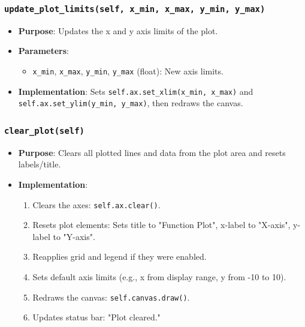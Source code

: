 \documentclass[12pt,a4paper]{report}
\begin{document}
\subsubsection{\texttt{update\_plot\_limits(self, x\_min, x\_max, y\_min, y\_max)}}
\begin{itemize}
    \item \textbf{Purpose}: Updates the x and y axis limits of the plot.
    \item \textbf{Parameters}:
        \begin{itemize}
            \item \texttt{x\_min}, \texttt{x\_max}, \texttt{y\_min}, \texttt{y\_max} (float): New axis limits.
        \end{itemize}
    \item \textbf{Implementation}: Sets \texttt{self.ax.set\_xlim(x\_min, x\_max)} and \texttt{self.ax.set\_ylim(y\_min, y\_max)}, then redraws the canvas.
\end{itemize}

\subsubsection{\texttt{clear\_plot(self)}}
\begin{itemize}
    \item \textbf{Purpose}: Clears all plotted lines and data from the plot area and resets labels/title.
    \item \textbf{Implementation}:
        \begin{enumerate}
            \item Clears the axes: \texttt{self.ax.clear()}.
            \item Resets plot elements: Sets title to "Function Plot", x-label to "X-axis", y-label to "Y-axis".
            \item Reapplies grid and legend if they were enabled.
            \item Sets default axis limits (e.g., x from display range, y from -10 to 10).
            \item Redraws the canvas: \texttt{self.canvas.draw()}.
            \item Updates status bar: "Plot cleared."
        \end{enumerate}
\end{itemize}
\end{document}
